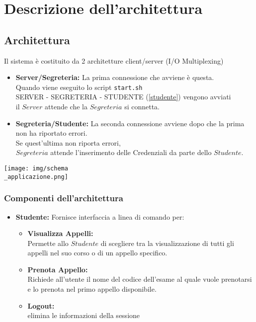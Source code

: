 \chapter{Descrizione dell'architettura} 
\newpage

\section{Architettura}
	Il sistema è costituito da 2 architetture client/server
	(I/O Multiplexing)
	\begin{itemize}
		\item \textbf{Server/Segreteria:} La prima connessione che avviene è questa.\\
		Quando viene eseguito lo script \texttt{start.sh}\\
		SERVER - SEGRETERIA - STUDENTE (\ref{studente}) vengono avviati\\
		il $Server$ attende che la $Segreteria$ si connetta.
		\item \textbf{Segreteria/Studente:} La seconda connessione avviene dopo che la prima non ha riportato errori.\\
		Se quest'ultima non riporta errori, \\
		$Segreteria$ attende l'inserimento delle Credenziali da parte dello $Studente$.
	\end{itemize}
	\begin{center}
		\texttt{[image: img/schema\\\_applicazione.png]}
	\end{center}
	\newpage
\subsection{Componenti dell'architettura}
\begin{itemize}
	\item \textbf{Studente:}\label{studente} Fornisce interfaccia a linea di comando per:\\
	\begin{itemize}
	\item \textbf {Visualizza Appelli:}\\ Permette allo $Studente$ di scegliere tra la visualizzazione di tutti gli appelli nel suo corso o di un appello specifico.
	\item \textbf {Prenota Appello:}\\
	Richiede all'utente il nome del codice dell'esame al quale vuole prenotarsi e lo prenota nel primo appello disponibile.
	\item \textbf {Logout:}\\
	elimina le informazioni della sessione
	\end{itemize}
	
\end{itemize}

